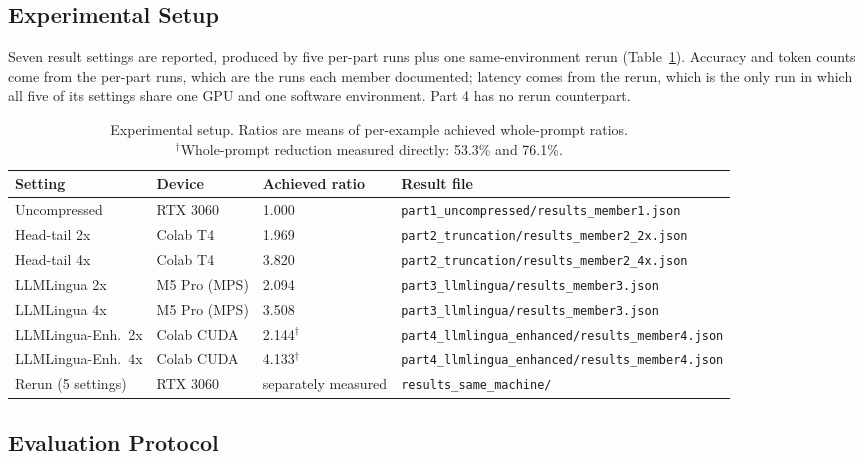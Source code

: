 \documentclass[10pt,a4paper,twocolumn]{article}
\begin{document}
\subsection{Experimental Setup}

Seven result settings are reported, produced by five per-part runs plus one
same-environment rerun (Table~\ref{tab:setup}). Accuracy and token counts come from
the per-part runs, which are the runs each member documented; latency comes from
the rerun, which is the only run in which all five of its settings share one GPU
and one software environment. Part 4 has no rerun counterpart.

\begin{table}[t]
\centering
\footnotesize
\setlength{\tabcolsep}{6pt}
\begin{tabular}{@{}llll@{}}
\toprule
Setting & Device & Achieved ratio & Result file \\
\midrule
Uncompressed & RTX 3060 & 1.000 & \texttt{part1\_uncompressed/results\_member1.json} \\
Head-tail 2x & Colab T4 & 1.969 & \texttt{part2\_truncation/results\_member2\_2x.json} \\
Head-tail 4x & Colab T4 & 3.820 & \texttt{part2\_truncation/results\_member2\_4x.json} \\
LLMLingua 2x & M5 Pro (MPS) & 2.094 & \texttt{part3\_llmlingua/results\_member3.json} \\
LLMLingua 4x & M5 Pro (MPS) & 3.508 & \texttt{part3\_llmlingua/results\_member3.json} \\
LLMLingua-Enh.\ 2x & Colab CUDA & 2.144$^{\dagger}$ & \texttt{part4\_llmlingua\_enhanced/results\_member4.json} \\
LLMLingua-Enh.\ 4x & Colab CUDA & 4.133$^{\dagger}$ & \texttt{part4\_llmlingua\_enhanced/results\_member4.json} \\
\midrule
Rerun (5 settings) & RTX 3060 & separately measured & \texttt{results\_same\_machine/} \\
\bottomrule
\end{tabular}
\caption{Experimental setup. Ratios are means of per-example achieved whole-prompt ratios.\\
$^{\dagger}$Whole-prompt reduction measured directly: 53.3\% and 76.1\%.}
\label{tab:setup}
\end{table}

\subsection{Evaluation Protocol}
\label{sec:protocol}
\end{document}
